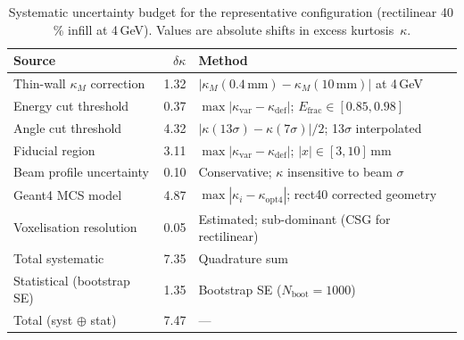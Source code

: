 \begin{table}
  \centering
  \caption{Systematic uncertainty budget for the representative configuration (rectilinear 40\,\% infill at 4\,GeV).  Values are absolute shifts in excess kurtosis~$\kappa$.}
  \label{tab:systematics}
  \begin{tabular}{@{}l r p{6.2cm}@{}}
    \toprule
    Source & $\delta\kappa$ & Method \\
    \midrule
    Thin-wall $\kappa_M$ correction & 1.32 & $|\kappa_M(0.4\,\mathrm{mm}) - \kappa_M(10\,\mathrm{mm})|$ at 4\,GeV \\
    Energy cut threshold & 0.37 & $\max|\kappa_\mathrm{var} - \kappa_\mathrm{def}|$; $E_\mathrm{frac}\in[0.85,0.98]$ \\
    Angle cut threshold & 4.32 & $|\kappa(13\sigma) - \kappa(7\sigma)|/2$; 13$\sigma$ interpolated \\
    Fiducial region & 3.11 & $\max|\kappa_\mathrm{var} - \kappa_\mathrm{def}|$; $|x|\in[3,10]$\,mm \\
    Beam profile uncertainty & 0.10 & Conservative; $\kappa$ insensitive to beam $\sigma$ \\
    Geant4 MCS model & 4.87 & $\max|\kappa_i - \kappa_\mathrm{opt4}|$; rect40 corrected geometry \\
    Voxelisation resolution & 0.05 & Estimated; sub-dominant (CSG for rectilinear) \\
    \midrule
    Total systematic & 7.35 & Quadrature sum \\
    \midrule
    Statistical (bootstrap SE) & 1.35 & Bootstrap SE ($N_\mathrm{boot} = 1000$) \\
    \midrule
    Total (syst $\oplus$ stat) & 7.47 & --- \\
    \bottomrule
  \end{tabular}
\end{table}
